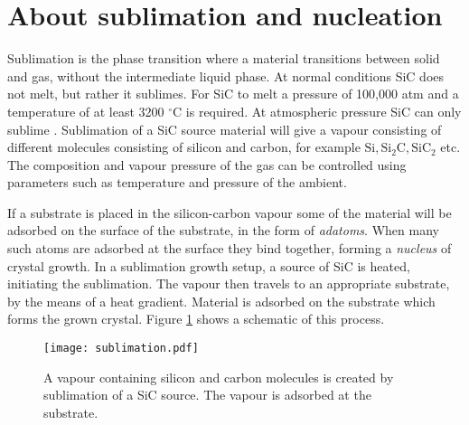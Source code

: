  \section{About sublimation and nucleation}
 Sublimation is the phase transition where a material transitions between solid and gas, without the intermediate liquid phase. At normal conditions SiC does not melt, but rather it sublimes. For SiC to melt a pressure of 100,000 atm and a temperature of at least 3200 $^\circ$C is required. At atmospheric pressure SiC can only sublime \cite{Scheel2003}. Sublimation of a SiC source material will give a vapour consisting of different molecules consisting of silicon and carbon, for example $\mathrm{Si, Si_2C, SiC_2}$ etc. The composition and vapour pressure of the gas can be controlled using parameters such as temperature and pressure of the ambient. 
 
If a substrate is placed in the silicon-carbon vapour some of the material will be adsorbed on the surface of the substrate, in the form of \emph{adatoms}. When many such atoms are adsorbed at the surface they bind together, forming a \emph{nucleus} of crystal growth. In a sublimation growth setup, a source of SiC is heated, initiating the sublimation. The vapour then travels to an appropriate substrate, by the means of a heat gradient. Material is adsorbed on the substrate which forms the grown crystal. Figure \ref{fig:sublimation} shows a schematic of this process. 

\begin{figure}[h]
\begin{center}
\texttt{[image: sublimation.pdf]}
\caption{A vapour containing silicon and carbon molecules is created by sublimation of a SiC source. The vapour is adsorbed at the substrate. 
\label{fig:sublimation}}
\end{center}
\end{figure}
 

